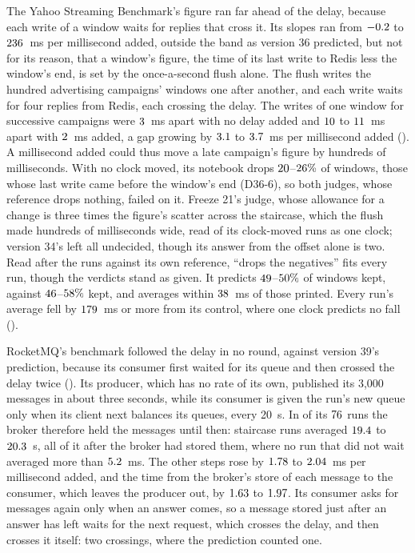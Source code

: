 \documentclass[10pt,journal,onecolumn]{IEEEtran}
\begin{document}
The Yahoo Streaming Benchmark's figure ran far ahead of the delay, because each write of a window
waits for replies that cross it. Its slopes ran from $-0.2$ to $236$~ms per
millisecond added, outside the band as version 36 predicted, but not for its reason, that a
window's figure, the time of its last write to Redis less the window's end, is set by the
once-a-second flush alone. The flush writes the hundred advertising campaigns' windows one after another, and
each write waits for four replies from Redis, each crossing the delay. The writes of one window for
successive campaigns were $3$~ms apart with no delay added and $10$ to
$11$~ms apart with $2$~ms added, a gap growing by
$3.1$ to $3.7$~ms per millisecond added
(). A millisecond added could thus move a late campaign's figure by
hundreds of milliseconds. With no clock moved, its notebook drops
$20$--$26\%$ of windows, those whose last write came before
the window's end (D36-6), so both judges, whose reference drops nothing, failed on it. Freeze 21's
judge, whose allowance for a change is three times the figure's scatter across the staircase, which
the flush made hundreds of milliseconds wide, read \toolsYsbOneClockWord{} of its
\toolsYsbRunsWord{} clock-moved runs as one clock; version 34's left all undecided, though its
answer from the offset alone is two. Read after the runs against its own reference, ``drops the
negatives'' fits every run, though the verdicts stand as given. It predicts
$49$--$50\%$ of windows kept, against
$46$--$58\%$ kept, and averages within $38$~ms of
those printed. Every run's average fell by $179$~ms or more from its control, where one
clock predicts no fall ().

RocketMQ's benchmark followed the delay in no round, against version 39's prediction, because its
consumer first waited for its queue and then crossed the delay twice
(). Its producer, which has no rate of its own, published its
3,000 messages in about three seconds, while its consumer is given the run's new queue only when its
client next balances its queues, every 20~s. In \toolsRocketWaitedWord{} of its
$76$ runs the broker therefore held the messages until then:
\toolsRocketLongWaitsWord{} staircase runs averaged $19.4$ to
$20.3$~s, all of it after the broker had stored them, where no run that did not
wait averaged more than $5.2$~ms. The other steps rose by $1.78$ to
$2.04$~ms per millisecond added, and the time from the broker's store of each
message to the consumer, which leaves the producer out, by $1.63$ to
$1.97$. Its consumer asks for messages again only when an answer comes, so a message
stored just after an answer has left waits for the next request, which crosses the delay, and then
crosses it itself: two crossings, where the prediction counted one.
\end{document}

